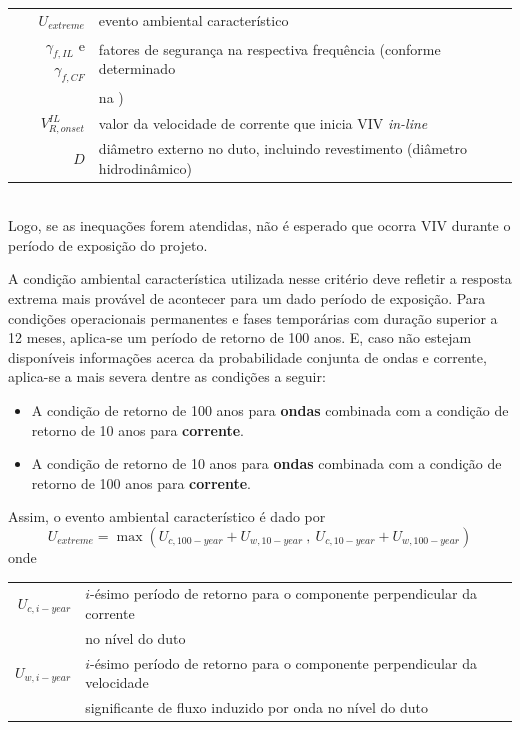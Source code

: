 \begin{tabular}{rl}
	$U_\mathit{extreme}$                                  & evento ambiental característico\\
	$\gamma_{f,\mathit{IL}}$  e  $\gamma_{f,\mathit{CF}}$ & fatores de segurança na respectiva frequência (conforme determinado \\
 	                                                      & na \dnvf105)\\
	$V_{R,\mathit{onset}}^\mathit{IL}$                    & valor da  velocidade de corrente que inicia VIV \textit{in-line}\\
	$D$                                                   & diâmetro externo no duto, incluindo revestimento (diâmetro hidrodinâmico)\\
\end{tabular}\\
Logo, se as inequações forem atendidas, não é esperado que ocorra VIV durante o período de exposição do projeto.


A condição ambiental característica utilizada nesse critério deve refletir a resposta extrema mais provável de acontecer para um dado período de exposição.
Para condições operacionais permanentes e fases temporárias com duração superior a 12 meses, aplica-se um período de retorno de 100 anos.
E, caso não estejam disponíveis informações acerca da probabilidade conjunta de ondas e corrente, aplica-se a mais severa dentre as condições a seguir:
\begin{itemize}
\item A condição de retorno de 100 anos para \textbf{ondas} combinada com a condição de retorno de 10 anos para \textbf{corrente}.
\item A condição de retorno de 10 anos para \textbf{ondas} combinada com a condição de retorno de 100 anos para \textbf{corrente}.
\end{itemize}
Assim, o evento ambiental característico é dado por
\begin{equation}
U_\mathit{extreme} = \max\left( U_{c,100-\mathit{year}} + U_{w,10-\mathit{year}} ~,~ U_{c,10-\mathit{year}} + U_{w,100-\mathit{year}} \right)
\end{equation}
onde

\begin{tabular}{rl}
$U_{c,i-\mathit{year}}$ & $i$-ésimo período de retorno para o componente perpendicular da corrente \\
                        & no nível do duto\\
$U_{w,i-\mathit{year}}$ & $i$-ésimo período de retorno para o componente perpendicular da velocidade \\
                        & significante de fluxo induzido por onda no nível do duto
\end{tabular}


